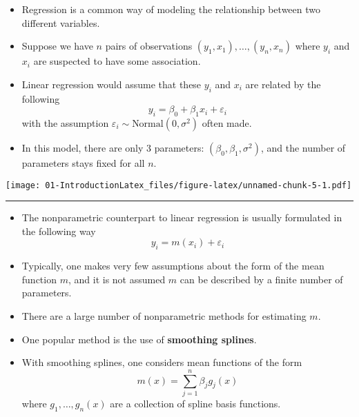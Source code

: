 \documentclass[]{book}
\begin{document}
\begin{itemize}
\item
  Regression is a common way of modeling the relationship between two different variables.
\item
  Suppose we have \(n\) pairs of observations \((y_{1}, x_{1}), \ldots, (y_{n}, x_{n})\) where
  \(y_{i}\) and \(x_{i}\) are suspected to have some association.
\item
  Linear regression would assume that these \(y_{i}\) and \(x_{i}\) are related by the following
  \begin{equation}
  y_{i} = \beta_{0} + \beta_{1}x_{i} + \varepsilon_{i} 
  \end{equation}
  with the assumption \(\varepsilon_{i} \sim \textrm{Normal}(0, \sigma^{2})\) often made.
\item
  In this model, there are only 3 parameters: \((\beta_{0}, \beta_{1}, \sigma^{2})\),
  and the number of parameters stays fixed for all \(n\).
\end{itemize}

\texttt{[image: 01-IntroductionLatex\_files/figure-latex/unnamed-chunk-5-1.pdf]}

\begin{center}\rule{0.5\linewidth}{\linethickness}\end{center}

\begin{itemize}
\item
  The nonparametric counterpart to linear regression is usually formulated in the following way
  \begin{equation}
  y_{i} = m( x_{i} ) + \varepsilon_{i}
  \end{equation}
\item
  Typically, one makes very few assumptions about the form of the mean function \(m\), and it is not assumed \(m\)
  can be described by a finite number of parameters.
\item
  There are a large number of nonparametric methods for estimating \(m\).
\item
  One popular method is the use of \textbf{smoothing splines}.
\item
  With smoothing splines, one considers mean functions of the form
  \begin{equation}
  m(x) = \sum_{j=1}^{n} \beta_{j}g_{j}(x) 
  \label{eq:smoothspline-model}
  \end{equation}
  where \(g_{1}, \ldots, g_{n}(x)\) are a collection of spline basis functions.
\end{itemize}
\end{document}
